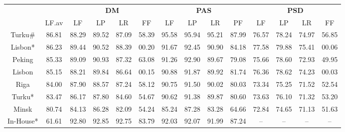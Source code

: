 \begin{table}
    \centering
    \smaller[]
    \smaller[]
    \smaller[]
    \begin{tabular}{@{}cccccccccccccc@{}}
        \toprule
        \multicolumn{1}{c}{ }
        & \multicolumn{1}{c}{ }
        & \multicolumn{4}{c}{\textbf{DM}}
        & \multicolumn{4}{c}{\textbf{PAS}}
        & \multicolumn{4}{c}{\textbf{PSD}} \\
        \cmidrule(lr){3-6}
        \cmidrule(lr){7-10}
        \cmidrule(lr){11-14}
        &
        LF.av &
        LF & LP & LR & FF &
        LF & LP & LR & PF &
        LF & LP & LR & FF \\
        \midrule
        Turku\# & 86.81 & 88.29 & 89.52 & 87.09 & 58.39 & 95.58 & 95.94 & 95.21 & 87.99 & 76.57 & 78.24 & 74.97 & 56.85 \\
        Lisbon* & 86.23 & 89.44 & 90.52 & 88.39 & 00.20 & 91.67 & 92.45 & 90.90 & 84.18 & 77.58 & 79.88 & 75.41 & 00.06 \\
        Peking & 85.33 & 89.09 & 90.93 & 87.32 & 63.08 & 91.26 & 92.90 & 89.67 & 79.08 & 75.66 & 78.60 & 72.93 & 49.95 \\
        Lisbon & 85.15 & 88.21 & 89.84 & 86.64 & 00.15 & 90.88 & 91.87 & 89.92 & 81.74 & 76.36 & 78.62 & 74.23 & 00.03 \\
        Riga & 84.00 & 87.90 & 88.57 & 87.24 & 58.12 & 90.75 & 91.50 & 90.02 & 80.03 & 73.34 & 75.25 & 71.52 & 52.54 \\
        Turku* & 83.47 & 86.17 & 87.80 & 84.60 & 54.67 & 90.62 & 91.38 & 89.87 & 80.60 & 73.63 & 76.10 & 71.32 & 53.20 \\
        Minsk & 80.74 & 84.13 & 86.28 & 82.09 & 54.24 & 85.24 & 87.28 & 83.28 & 64.66 & 72.84 & 74.65 & 71.13 & 51.63 \\
        In-House* & 61.61 & 92.80 & 92.85 & 92.75 & 83.79 & 92.03 & 92.07 & 91.99 & 87.24 & – & – & – & – \\
        \bottomrule
        

\end{tabular}
\end{table}
